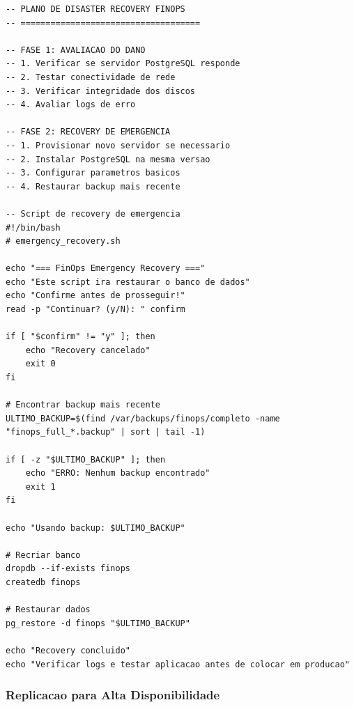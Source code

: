 \begin{lstlisting}[caption=Procedimento de disaster recovery]
-- PLANO DE DISASTER RECOVERY FINOPS
-- ====================================

-- FASE 1: AVALIACAO DO DANO
-- 1. Verificar se servidor PostgreSQL responde
-- 2. Testar conectividade de rede
-- 3. Verificar integridade dos discos
-- 4. Avaliar logs de erro

-- FASE 2: RECOVERY DE EMERGENCIA
-- 1. Provisionar novo servidor se necessario
-- 2. Instalar PostgreSQL na mesma versao
-- 3. Configurar parametros basicos
-- 4. Restaurar backup mais recente

-- Script de recovery de emergencia
#!/bin/bash
# emergency_recovery.sh

echo "=== FinOps Emergency Recovery ==="
echo "Este script ira restaurar o banco de dados"
echo "Confirme antes de prosseguir!"
read -p "Continuar? (y/N): " confirm

if [ "$confirm" != "y" ]; then
    echo "Recovery cancelado"
    exit 0
fi

# Encontrar backup mais recente
ULTIMO_BACKUP=$(find /var/backups/finops/completo -name "finops_full_*.backup" | sort | tail -1)

if [ -z "$ULTIMO_BACKUP" ]; then
    echo "ERRO: Nenhum backup encontrado"
    exit 1
fi

echo "Usando backup: $ULTIMO_BACKUP"

# Recriar banco
dropdb --if-exists finops
createdb finops

# Restaurar dados
pg_restore -d finops "$ULTIMO_BACKUP"

echo "Recovery concluido"
echo "Verificar logs e testar aplicacao antes de colocar em producao"
\end{lstlisting}

\subsubsection{Replicacao para Alta Disponibilidade}

